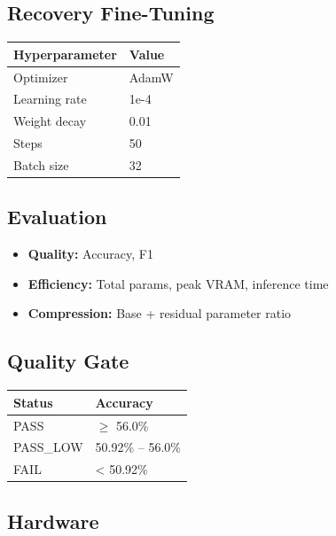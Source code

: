 \subsection{Recovery Fine-Tuning}

\begin{table}[H]
\centering
\small
\begin{tabular}{ll}
\toprule
\textbf{Hyperparameter} & \textbf{Value} \\
\midrule
Optimizer & AdamW \\
Learning rate & 1e-4 \\
Weight decay & 0.01 \\
Steps & 50 \\
Batch size & 32 \\
\bottomrule
\end{tabular}
\end{table}

\subsection{Evaluation}

\begin{itemize}
\item \textbf{Quality:} Accuracy, F1
\item \textbf{Efficiency:} Total params, peak VRAM, inference time
\item \textbf{Compression:} Base + residual parameter ratio

\end{itemize}
\subsection{Quality Gate}

\begin{table}[H]
\centering
\small
\begin{tabular}{ll}
\toprule
\textbf{Status} & \textbf{Accuracy} \\
\midrule
PASS & $\ge$ 56.0\% \\
PASS\_LOW & 50.92\% -- 56.0\% \\
FAIL & \textless{} 50.92\% \\
\bottomrule
\end{tabular}
\end{table}

\subsection{Hardware}

